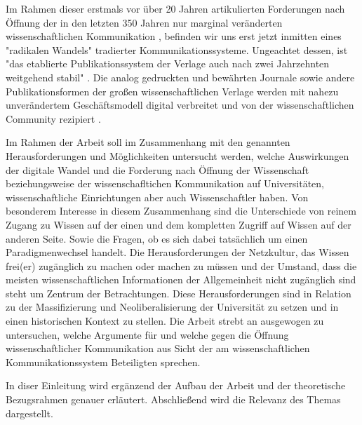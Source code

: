 Im Rahmen dieser erstmals vor über 20 Jahren artikulierten Forderungen nach Öffnung der in den letzten 350 Jahren nur marginal veränderten wissenschaftlichen Kommunikation \cite{poynder_2011_suber bzw suchen}, befinden wir uns erst jetzt inmitten eines "radikalen Wandels" \cite{poynder_2011_suber} tradierter Kommunikationssysteme. Ungeachtet dessen, ist "das etablierte Publikationssystem der Verlage auch nach zwei Jahrzehnten weitgehend stabil" \cite{Hanekop_2014}. Die analog gedruckten und bewährten Journale sowie andere Publikationsformen der großen wissenschaftlichen Verlage werden mit nahezu unverändertem Geschäftsmodell digital verbreitet \cite{Hanekop_2014} \cite{boai_2012} und von der wissenschaftlichen Community rezipiert \cite{suchen}.

Im Rahmen der Arbeit soll im Zusammenhang mit den genannten Herausforderungen und Möglichkeiten untersucht werden, welche Auswirkungen der digitale Wandel und die Forderung nach Öffnung der Wissenschaft beziehungsweise der wissenschafltichen Kommunikation auf Universitäten, wissenschaftliche Einrichtungen aber auch Wissenschaftler haben. Von besonderem Interesse in diesem Zusammenhang sind die Unterschiede von reinem Zugang zu Wissen auf der einen und dem kompletten Zugriff auf Wissen auf der anderen Seite. Sowie die Fragen, ob es sich dabei tatsächlich um einen Paradigmenwechsel handelt. Die Herausforderungen der Netzkultur, das Wissen frei(er) zugänglich zu machen oder machen zu müssen und der Umstand, dass die meisten wissenschaftlichen Informationen der Allgemeinheit nicht zugänglich sind \cite{cite:6} steht um Zentrum der Betrachtungen. Diese Herausforderungen sind in Relation zu der Massifizierung und Neoliberalisierung der Universität zu setzen und in einen historischen Kontext zu stellen. Die Arbeit strebt an ausgewogen zu untersuchen, welche Argumente für und welche gegen die Öffnung wissenschaftlicher Kommunikation aus Sicht der am wissenschaftlichen Kommunikationssystem Beteiligten sprechen.

In diser Einleitung wird ergänzend der Aufbau der Arbeit und der theoretische Bezugsrahmen genauer erläutert. Abschließend wird die Relevanz des Themas dargestellt.